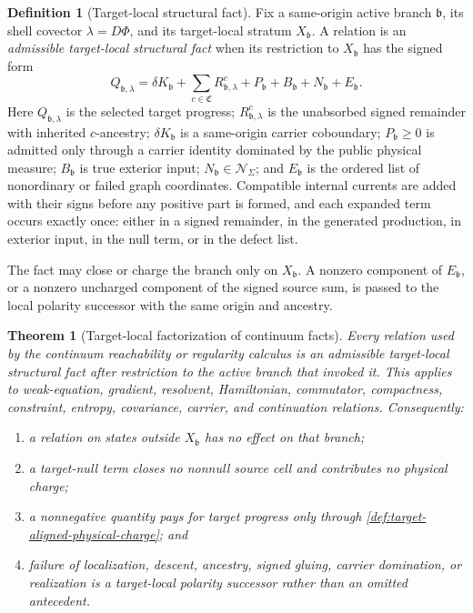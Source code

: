 \documentclass[11pt]{article}
\numberwithin{section}{part}
\theoremstyle{plain}
\newtheorem{theorem}{Theorem}[section]
\theoremstyle{definition}
\newtheorem{definition}[definition]{Definition}
\theoremstyle{remark}
\newcommand{\Channels}{\mathfrak C}
\newcommand{\Null}{\mathscr N}
\begin{document}
\begin{definition}[Target-local structural fact]
\label{def:target-local-structural-fact}
Fix a same-origin active branch \(\mathfrak b\), its shell covector
\(\lambda=D\Phi\), and its target-local stratum \(X_{\mathfrak b}\).  A
relation is an \emph{admissible target-local structural fact} when its
restriction to \(X_{\mathfrak b}\) has the signed form
\begin{equation}
 \label{eq:target-local-fact-normal-form}
 Q_{\mathfrak b,\lambda}
 =\delta K_{\mathfrak b}
  +\sum_{c\in\Channels}R_{\mathfrak b,\lambda}^{c}
  +P_{\mathfrak b}+B_{\mathfrak b}
  +N_{\mathfrak b}+E_{\mathfrak b}.
\end{equation}
Here \(Q_{\mathfrak b,\lambda}\) is the selected target progress;
\(R^c_{\mathfrak b,\lambda}\) is the unabsorbed signed remainder with
inherited \(c\)-ancestry;
\(\delta K_{\mathfrak b}\) is a same-origin carrier coboundary;
\(P_{\mathfrak b}\ge0\) is admitted only through a carrier identity dominated
by the public physical measure; \(B_{\mathfrak b}\) is true exterior input;
\(N_{\mathfrak b}\in\Null_\Sigma\); and \(E_{\mathfrak b}\) is the ordered
list of nonordinary or failed graph coordinates.  Compatible internal
currents are added with their signs before any positive part is formed, and
each expanded term occurs exactly once: either in a signed remainder, in the
generated production, in exterior input, in the null term, or in the defect
list.

The fact may close or charge the branch only on
\(X_{\mathfrak b}\).  A nonzero component of \(E_{\mathfrak b}\), or a
nonzero uncharged component of the signed source sum, is passed to the local
polarity successor with the same origin and ancestry.
\end{definition}

\begin{theorem}[Target-local factorization of continuum facts]
\label{thm:target-local-fact-factorization}
Every relation used by the continuum reachability or regularity calculus is
an admissible target-local structural fact after restriction to the active
branch that invoked it.  This applies to weak-equation, gradient, resolvent,
Hamiltonian, commutator, compactness, constraint, entropy, covariance,
carrier, and continuation relations.  Consequently:
\begin{enumerate}[label=\textup{(F\arabic*)}]
\item a relation on states outside \(X_{\mathfrak b}\) has no effect on that
branch;
\item a target-null term closes no nonnull source cell and contributes no
physical charge;
\item a nonnegative quantity pays for target progress only through
\cref{def:target-aligned-physical-charge}; and
\item failure of localization, descent, ancestry, signed gluing, carrier
domination, or realization is a target-local polarity successor rather than
an omitted antecedent.
\end{enumerate}
\end{theorem}
\end{document}
